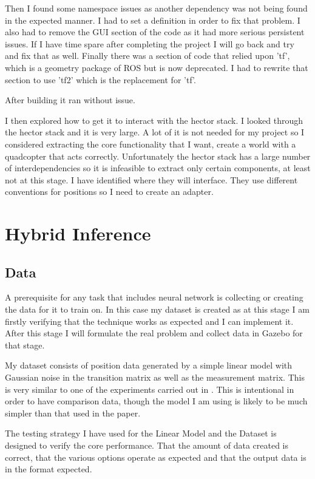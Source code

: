 \documentclass[]{../resources/final_report}
\begin{document}
Then I found some namespace issues as another dependency was not being found in the expected manner.
I had to set a definition in order to fix that problem. I also had to remove the GUI section of the 
code as it had more serious persistent issues. If I have time spare after completing the project I 
will go back and try and fix that as well. Finally there was a section of code that relied upon 'tf', 
which is a geometry package of ROS but is now deprecated. I had to rewrite that section to use 'tf2' 
which is the replacement for 'tf'.

After building it ran without issue.

I then explored how to get it to interact with the hector stack. I looked through the hector stack and it is 
very large. A lot of it is not needed for my project so I considered extracting the core functionality
that I want, create a world with a quadcopter that acts correctly. Unfortunately the hector stack 
has a large number of interdependencies so it is infeasible to extract only certain components, at 
least not at this stage. I have identified where they will interface. They use different conventions 
for positions so I need to create an adapter.

\section{Hybrid Inference}

\subsection{Data}
A prerequisite for any task that includes neural network is collecting or creating the data for it 
to train on. In this case my dataset is created as at this stage I am firstly verifying that the 
technique works as expected and I can implement it. After this stage I will formulate the real 
problem and collect data in Gazebo for that stage.

My dataset consists of position data generated by a simple linear model with Gaussian noise in the 
transition matrix as well as the measurement matrix. This is very similar to one of the experiments 
carried out in \cite{Satorras2019CombiningGA}. This is intentional in order to have comparison data,
though the model I am using is likely to be much simpler than that used in the paper.

The testing strategy I have used for the Linear Model and the Dataset is designed to verify the core
performance. That the amount of data created is correct, that the various options operate as expected 
and that the output data is in the format expected.
\end{document}
